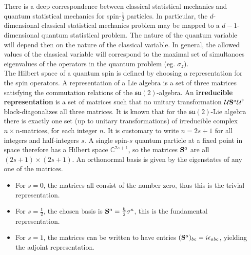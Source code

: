 \documentclass{homework}
\begin{document}



There is a deep correspondence between classical statistical mechanics and quantum statistical mechanics for spin-$\frac{1}{2}$ particles. In particular, the $d$-dimensional classical statistical mechanics problem may be mapped to a $d-1$-dimensional quantum statistical problem. The nature of the quantum variable will depend then on the nature of the classical variable. In general, the allowed values of the classical variable will correspond to the maximal set of simultanoes eigenvalues of the operators in the quantum problem (eg. $\sigma_z$). \\

The Hilbert space of a quantum spin is defined by choosing a representation for the spin operators. A representation of a Lie algebra is a set of three matrices satisfying the commutation relations of the $\mathfrak{su}(2)$-algebra. An \textbf{irreducible representation} is a set of matrices such that no unitary transformation $\mathcal{U} {\bf S}^{a} \mathcal{U}^\dagger$ block-diagonalizes all three matrices. It is known that for the $\mathfrak{su}(2)$-Lie algebra there is exactly one set (up to unitary transformations) of irreducible complex $n\times n$-matrices, for each integer $n$. It is customary to write $n=2s+1$ for all integers and half-integers $s$. A single spin-$s$ quantum particle at a fixed point in space therefore has a Hilbert space $\mathds{C}^{2s+1}$, so the matrices ${\bf S}^a$ are all $(2s+1)\times(2s+1)$. An orthonormal basis is given by the eigenstates of any one of the matrices. 

\begin{itemize}
    \item For $s=0$, the matrices all consist of the number zero, thus this is the trivial representation. 
    \item For $s = \frac{1}{2}$, the chosen basis is ${\bf S}^a = \frac{\hbar}{2} \sigma^a$, this is the fundamental representation.
    \item For $s=1$, the matrices can be written to have entries $({\bf S}^a)_{bc} = i \epsilon_{abc}$, yielding the adjoint representation.
\end{itemize}
\end{document}
